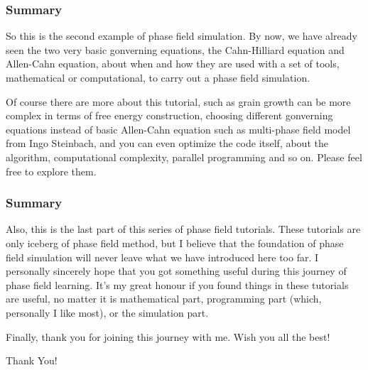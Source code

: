 \documentclass[compress,xcolor={dvipsnames}]{beamer}
\begin{document}
\begin{frame}
    \frametitle{Summary}

    So this is the second example of phase field simulation. By now, we have already seen the two very basic gonverning equations, the Cahn-Hilliard equation and Allen-Cahn equation, about when and how they are used with a set of tools, mathematical or computational, to carry out a phase field simulation.

    Of course there are more about this tutorial, such as grain growth can be more complex in terms of free energy construction, choosing different gonverning equations instead of basic Allen-Cahn equation such as multi-phase field model from Ingo Steinbach, and you can even optimize the code itself, about the algorithm, computational complexity, parallel programming and so on. Please feel free to explore them.

\end{frame}

\begin{frame}
    \frametitle{Summary}

    Also, this is the last part of this series of phase field tutorials. These tutorials are only iceberg of phase field method, but I believe that the foundation of phase field simulation will never leave what we have introduced here too far. I personally sincerely hope that you got something useful during this journey of phase field learning. It's my great honour if you found things in these tutorials are useful, no matter it is mathematical part, programming part (which, personally I like most), or the simulation part.

    Finally, thank you for joining this journey with me. Wish you all the best!

\end{frame}

\begin{frame}
    \begin{center}
        {\Huge \calligra Thank You!}
    \end{center}
\end{frame}
\end{document}
